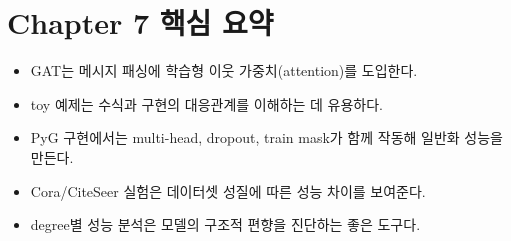 \documentclass[11pt,a4paper]{article}
\begin{document}
\section{Chapter 7 핵심 요약}

\begin{itemize}[leftmargin=*]
  \item GAT는 메시지 패싱에 학습형 이웃 가중치(attention)를 도입한다.
  \item toy 예제는 수식과 구현의 대응관계를 이해하는 데 유용하다.
  \item PyG 구현에서는 multi-head, dropout, train mask가 함께 작동해 일반화 성능을 만든다.
  \item Cora/CiteSeer 실험은 데이터셋 성질에 따른 성능 차이를 보여준다.
  \item degree별 성능 분석은 모델의 구조적 편향을 진단하는 좋은 도구다.
\end{itemize}
\end{document}
